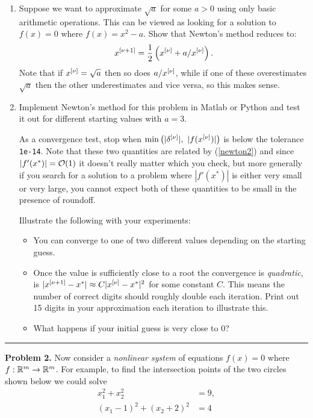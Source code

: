\documentclass[10pt]{article}
\begin{document}
\begin{enumerate} 
\item Suppose we want to approximate $\sqrt{a}$ for some $a>0$ using only basic
arithmetic operations.  This can be viewed as looking for a solution to $f(x)=0$
where $f(x) = x^2 - a$.  Show that Newton's method reduces to:
\[
x^{[\nu+1]} = \frac 1 2 \left(x^{[\nu]} + a / x^{[\nu]}\right).
\]
Note that if $x^{[\nu]}=\sqrt{a}$ then so does $a / x^{[\nu]}$, while if one of these
overestimates $\sqrt{a}$ then the other underestimates and vice versa, so this
makes sense.

\item Implement Newton's method for this problem in Matlab or Python and test it
out for different starting values with $a = 3$.  

As a convergence test, stop when
$\min\left(|\delta^{[\nu]}|,~|f(x^{[\nu]})|\right)$ 
is below the tolerance {\tt 1e-14}.  
Note that these two quantities are related by
(\ref{newton2}) and since $|f'(x^*)| = {\cal O}(1)$ it doesn't really matter which
you check, but more generally if you search for a solution to a problem where
$|f'(x^*)|$ is either very small or very large, you cannot expect both of these
quantities to be small in the presence of roundoff.

Illustrate the following with your experiments:

\begin{itemize}
\item You can converge to one of two different values depending on the starting
guess.  
\item Once the value is sufficiently close to a root the convergence is {\em
quadratic}, is $|x^{[\nu+1]} - x^*| \approx C |x^{[\nu]} - x^*|^2$ for some constant
$C$.  This means the number of correct digits should roughly double each
iteration.  Print out 15 digits in your approximation each iteration to illustrate
this.
\item What happens if your initial guess is very close to 0?
\end{itemize} 

\end{enumerate} 



\vskip 1cm
\hrule
{\bf Problem 2.}
Now consider a {\em nonlinear system} of equations $f(x)=0$ where $f:\mathbb{R}^m
\rightarrow \mathbb{R}^m$.  For example, to find the intersection points 
of the two circles shown below  we could solve
\[
\begin{split} 
x_1^2 + x_2^2 &= 9,\\
(x_1-1)^2 + (x_2+2)^2 &= 4
\end{split}
\]
\end{document}
